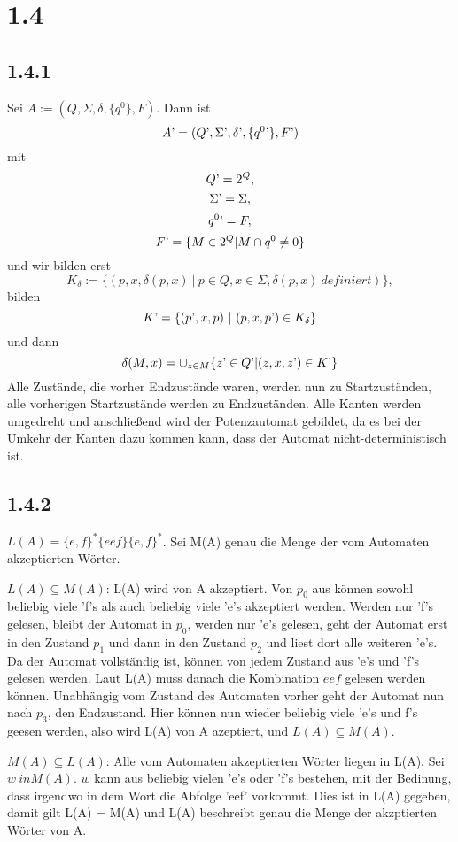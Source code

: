 \documentclass{article}
\begin{document}
\section*{1.4}
\subsection*{1.4.1}

Sei $A := (Q, \Sigma, \delta, \{q^0\}, F)$. 
Dann ist \[ A\textrm' = (Q\textrm', \Sigma\textrm', 
\delta\textrm', \{q^0\textrm'\},F\textrm') \]
mit \[ Q\textrm' = 2^Q,\]\[ \Sigma\textrm' = \Sigma,\] 
\[ q^0\textrm' = F,\] \[ F\textrm' = \{M \in 2^Q | M \cap q^0 \neq 0\} \] und wir bilden erst
\[K_\delta := \{ (p,x, \delta(p,x)~|~p \in Q, x \in \Sigma, \delta(p,x)~ definiert)\},\]
bilden \[K\textrm'= \{(p\textrm',x,p)~|~ (p,x,p\textrm') \in K_\delta\}\] und dann
\[\delta(M,x)= \cup_{z\in M} \{z\textrm' \in Q\textrm' | (z,x,z\textrm') \in K\textrm'\}\]
Alle Zustände, die vorher Endzustände waren, werden nun zu Startzuständen, alle vorherigen Startzustände werden
zu Endzuständen. Alle Kanten werden umgedreht und anschließend wird der Potenzautomat gebildet, da es bei der
Umkehr der Kanten dazu kommen kann, dass der Automat nicht-deterministisch ist. 
  

\subsection*{1.4.2}
$L(A) =\{e,f\}^*\{eef\}\{e,f\}^*$. Sei M(A) genau die Menge der vom Automaten akzeptierten Wörter. 

$L(A) \subseteq M(A)$: L(A) wird von A akzeptiert. Von $ p_0$ aus können sowohl beliebig viele 'f's als auch beliebig viele 'e's akzeptiert werden.  
Werden nur 'f's gelesen, bleibt der Automat in $p_0$, werden nur 'e's gelesen, geht der Automat erst in den Zustand $p_1$ und 
dann in den Zustand $p_2$ und liest dort alle weiteren 'e's. Da der Automat vollständig ist, können von jedem Zustand aus 
'e's und 'f's gelesen werden. Laut L(A) muss danach die Kombination {$eef$} gelesen werden können. Unabhängig vom Zustand
 des Automaten vorher geht der Automat nun nach $p_3$, den Endzustand. Hier können nun wieder beliebig viele 'e's und f's geesen werden, also 
wird L(A) von A azeptiert, und $L(A) \subseteq M(A)$.   

$M(A) \subseteq L(A)$: Alle vom Automaten akzeptierten Wörter liegen in L(A). Sei $w \ in M(A)$. $w$ kann aus beliebig vielen
'e's oder 'f's bestehen, mit der Bedinung, dass irgendwo in dem Wort die Abfolge 'eef' vorkommt. Dies ist in L(A) gegeben,
 damit gilt L(A) = M(A) und L(A) beschreibt genau die Menge der akzptierten Wörter von A. 
\end{document}

